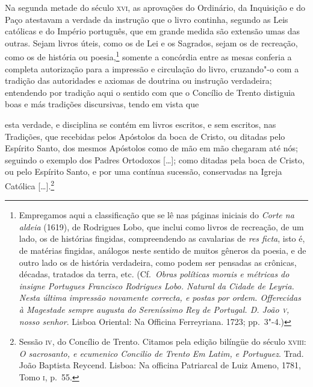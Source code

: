 Na segunda metade do século \textsc{xvi}, as aprovações do Ordinário, da
Inquisição e do Paço atestavam a verdade da instrução que o livro
continha, segundo as Leis católicas e do Império português, que em
grande medida são extensão umas das outras. Sejam livros úteis, como os
de Lei e os Sagrados, sejam os de recreação, como os de história ou
poesia,\footnote{ Empregamos aqui a classificação que se lê nas páginas
iniciais do \textit{Corte na aldeia} (1619), de Rodrigues Lobo, que inclui como
livros de recreação, de um lado, os de histórias fingidas, compreendendo
as cavalarias de \textit{res ficta}, isto é, de matérias fingidas, análogos neste
sentido de muitos gêneros da poesia, e de outro lado os de história
verdadeira, como podem ser pensadas as crônicas, décadas, tratados da
terra, etc. (Cf.~\textit{Obras políticas morais e métricas do insigne Portugues
Francisco Rodrigues Lobo. Natural da Cidade de Leyria. Nesta última
impressão novamente correcta, e postas por ordem. Offerecidas à
Magestade sempre augusta do Sereníssimo Rey de Portugal. D. João \textsc{v},
nosso senhor}. Lisboa Oriental: Na Officina Ferreyriana. 1723;
pp.~3"-4.)} somente a concórdia entre as mesas conferia a completa
autorização para a impressão e circulação do livro, cruzando"-o com a
tradição das autoridades e axiomas de doutrina ou instrução verdadeira;
entendendo por tradição aqui o sentido com que o Concílio de Trento
distiguia boas e más tradições discursivas, tendo em vista que 

\begin{hedraquote}
esta verdade, e disciplina se contém em livros escritos, e sem escritos,
nas Tradições, que recebidas pelos Apóstolos da boca de Cristo, ou
ditadas pelo Espírito Santo, dos mesmos Apóstolos como de mão em mão
chegaram até nós; seguindo o exemplo dos Padres Ortodoxos [\ldots{}]; como
ditadas pela boca de Cristo, ou pelo Espírito Santo, e por uma
contínua sucessão, conservadas na Igreja Católica [\ldots{}].\footnote{ Sessão 
\textsc{iv}, do Concílio de Trento. Citamos pela edição bilíngüe do
século 	\textsc{xviii}: \textit{O sacrosanto, e ecumenico Concilio de Trento Em Latim, e
Portuguez}. Trad. João Baptista Reycend. Lisboa: Na officina Patriarcal
de Luiz Ameno, 1781, Tomo \textsc{i}, p.~55.}
\end{hedraquote}

